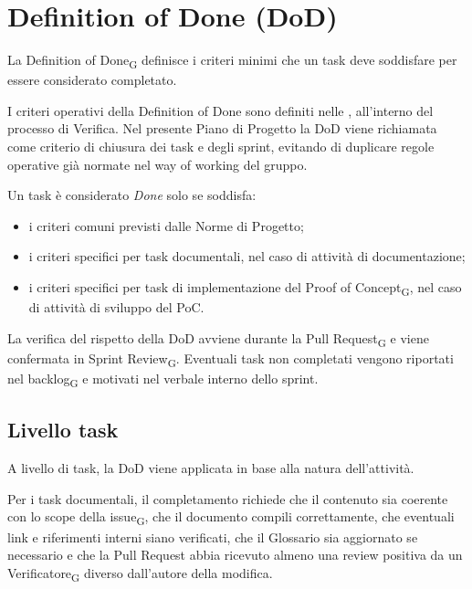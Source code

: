 \section{Definition of Done (DoD)}
\label{sec:dod}

La Definition of Done\textsubscript{G} definisce i criteri minimi che un task deve
soddisfare per essere considerato completato.

I criteri operativi della Definition of Done sono definiti nelle , all'interno del processo di Verifica. Nel presente Piano di Progetto
la DoD viene richiamata come criterio di chiusura dei task e degli sprint,
evitando di duplicare regole operative già normate nel way of working del
gruppo.

Un task è considerato \textit{Done} solo se soddisfa:
\begin{itemize}
\item i criteri comuni previsti dalle Norme di Progetto;
\item i criteri specifici per task documentali, nel caso di attività di
documentazione;
\item i criteri specifici per task di implementazione del Proof of
Concept\textsubscript{G}, nel caso di attività di sviluppo del PoC.
\end{itemize}

La verifica del rispetto della DoD avviene durante la Pull Request\textsubscript{G}
e viene confermata in Sprint Review\textsubscript{G}. Eventuali task non
completati vengono riportati nel backlog\textsubscript{G} e motivati nel
verbale interno dello sprint.

\subsection{Livello task}
\label{sec:dod-task}

A livello di task, la DoD viene applicata in base alla natura dell'attività.

Per i task documentali, il completamento richiede che il contenuto sia coerente
con lo scope della issue\textsubscript{G}, che il documento compili correttamente,
che eventuali link e riferimenti interni siano verificati, che il Glossario sia
aggiornato se necessario e che la Pull Request abbia ricevuto almeno una review
positiva da un Verificatore\textsubscript{G} diverso dall'autore della modifica.

